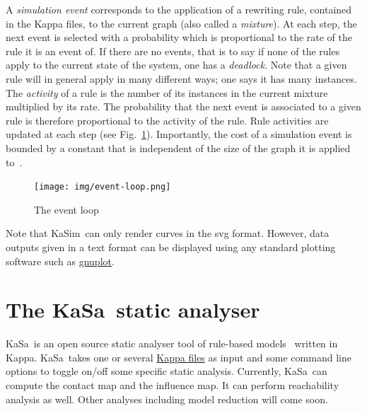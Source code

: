 \documentclass[11pt]{book}
\def\KaSim{\textsf{KaSim}}
\def\KaSa{\textsf{KaSa}}
\def\ie{ie }
\begin{document}
A \emph{simulation event} corresponds to the application of a rewriting rule, contained in the Kappa files, to the current graph (also called a \emph{mixture}).
At each step, the next event %
is selected with a probability which is proportional to the rate of the rule it is an event of.
If there are no events, that is to say if none of the rules apply to the current state of the system, one has a \emph{deadlock}. Note that a given rule will in general apply in many different ways; one says it has many instances. The \emph{activity} of a rule is the number of its instances in the current mixture multiplied by its rate. The probability that the next event is associated to a given rule is therefore proportional to the activity of the rule.
Rule activities are updated at
each step (see Fig.~\ref{fig:event-loop}). Importantly, the cost of a simulation event is bounded by a constant that is independent of the size of the graph it is applied to~\cite{Dan_etal07b}.

\begin{figure}[htbp]
\begin{center}
\texttt{[image: img/event-loop.png]}
\caption{The event loop}
\label{fig:event-loop}
\end{center}
\end{figure}

Note that \KaSim~can only render curves in the svg format. However, data outputs given in a text format can be displayed using any standard plotting software such as \href{http://www.gnuplot.info/}{gnuplot}.

\section{The \KaSa~static analyser}

\KaSa~is an open source static analyser  tool of rule-based models~\cite{DanLan04,Dan_etal07a,Fae_etal05} written in Kappa. \KaSa~takes one or several \hyperref[chap:kappa]{Kappa files} as input and some command line options to toggle on/off some specific static analysis. Currently, \KaSa~can compute the contact map and the influence map. It can perform reachability analysis \cite{Feret-ICCMSE2007,DanosEtAl-VMCAI08} as well.  Other analyses including  model reduction \cite{Feret-et-al-pnas2009,DanosEtAl-LICS2010,Feret-MFPSXXVII} will come soon.
\end{document}
